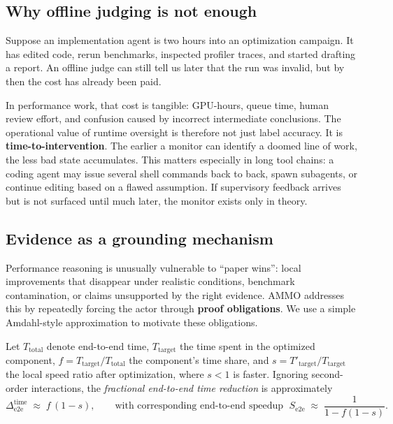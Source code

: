 \documentclass[11pt]{article}
\begin{document}
\subsection{Why offline judging is not enough}

Suppose an implementation agent is two hours into an optimization campaign. It has edited code, rerun benchmarks, inspected profiler traces, and started drafting a report. An offline judge can still tell us later that the run was invalid, but by then the cost has already been paid.

In performance work, that cost is tangible: GPU-hours, queue time, human review effort, and confusion caused by incorrect intermediate conclusions. The operational value of runtime oversight is therefore not just label accuracy. It is \textbf{time-to-intervention}. The earlier a monitor can identify a doomed line of work, the less bad state accumulates. This matters especially in long tool chains: a coding agent may issue several shell commands back to back, spawn subagents, or continue editing based on a flawed assumption. If supervisory feedback arrives but is not surfaced until much later, the monitor exists only in theory.

\subsection{Evidence as a grounding mechanism}

Performance reasoning is unusually vulnerable to ``paper wins'': local improvements that disappear under realistic conditions, benchmark contamination, or claims unsupported by the right evidence. AMMO addresses this by repeatedly forcing the actor through \textbf{proof obligations}. We use a simple Amdahl-style approximation to motivate these obligations.

Let $T_{\text{total}}$ denote end-to-end time, $T_{\text{target}}$ the time spent in the optimized component, $f = T_{\text{target}}/T_{\text{total}}$ the component's time share, and $s = T'_{\text{target}}/T_{\text{target}}$ the local speed ratio after optimization, where $s < 1$ is faster. Ignoring second-order interactions, the \emph{fractional end-to-end time reduction} is approximately
\begin{equation}
\Delta_{\text{e2e}}^{\text{time}} \;\approx\; f\,(1-s), \qquad \text{with corresponding end-to-end speedup } \; S_{\text{e2e}} \;\approx\; \frac{1}{1-f(1-s)}.
\label{eq:amdahl}
\end{equation}
\end{document}
